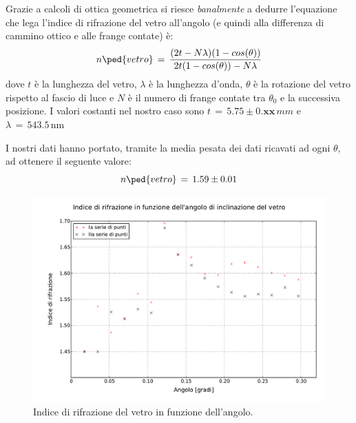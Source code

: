 Grazie a calcoli di ottica geometrica si riesce \emph{banalmente} a dedurre l'equazione che lega l'indice di rifrazione del vetro all'angolo (e quindi alla differenza di cammino ottico e alle frange contate) è:
\begin{equation}
	n\ped{vetro} \, = \, \frac{(2t - N \lambda) (1 - cos(\theta))}{2t(1-cos(\theta))-N\lambda}
\end{equation}
dove $t$ è la lunghezza del vetro, $\lambda$ è la lunghezza d'onda, $\theta$ è la rotazione del vetro rispetto al fascio di luce %
e $N$ è il numero di frange contate tra $\theta_0$ e la successiva posizione.
I valori costanti nel nostro caso sono $t \,=\, 5.75 \pm 0.\textbf{xx} \, mm$ e $\lambda \, = \, 543.5 \, \si{\nano\metre}$

I nostri dati hanno portato, tramite la media pesata dei dati ricavati ad ogni $\theta$, ad ottenere il seguente valore:
\begin{equation}
	n\ped{vetro} \, = \, 1.59 \pm 0.01
\end{equation}

\begin{figure}[t]
    \centering
        \includegraphics[width=\textwidth]{lol.pdf}
        \caption{Indice di rifrazione del vetro in funzione dell'angolo.}
        \label{fig:enne_theta}
\end{figure}